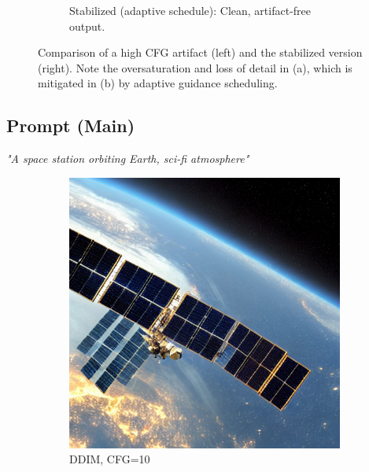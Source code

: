 \documentclass[10pt,twocolumn]{article}
\begin{document}
\begin{figure}[H]
\begin{subfigure}{0.45\textwidth}
        \caption{Stabilized (adaptive schedule): Clean, artifact-free output.}
    \end{subfigure}
    \caption{Comparison of a high CFG artifact (left) and the stabilized version (right). Note the oversaturation and loss of detail in (a), which is mitigated in (b) by adaptive guidance scheduling.}
    \label{fig:bad_vs_stabilized}
\end{figure}

\subsection*{Prompt (Main)}
\noindent\textit{"A space station orbiting Earth, sci-fi atmosphere"}

\begin{figure}[H]
    \centering
    \begin{subfigure}{0.32\textwidth}
        \includegraphics[width=\linewidth]{figures/baseline_ddim_cfg10.0_512_prompt10_20250712_113447.png}
        \caption{DDIM, CFG=10}
    \end{subfigure}
    \begin{subfigure}{0.32\textwidth}

\end{subfigure}
\end{figure}
\end{document}
